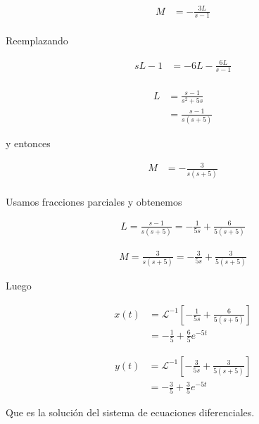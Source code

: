 \documentclass{article}
\theoremstyle{plain}
\theoremstyle{definition}
\begin{document}
\begin{align*}
M &= -\frac{3L}{s-1} \\
\end{align*}

Reemplazando

\begin{align*}
   sL-1 &= -6L-\frac{6L}{s-1} \\
\end{align*}



\begin{align*}
   L &= \frac{s-1}{s^2+5s} \\
   &= \frac{s-1}{s(s+5)}
\end{align*}

y entonces

\begin{align*}
M &= -\frac{3}{s(s+5)} \\
\end{align*}


Usamos fracciones parciales y obtenemos

\begin{align*}
L=\frac{s-1}{s(s+5)} = -\frac{1}{5s}+\frac{6}{5(s+5)}
\end{align*}

\begin{align*}
M= \frac{3}{s(s+5)} = -\frac{3}{5s}+\frac{3}{5(s+5)}
\end{align*}


Luego


\begin{align*}
x(t) &= \mathcal{L}^{-1} \left[ -\frac{1}{5s}+\frac{6}{5(s+5)}\right] \\
&= -\frac{1}{5}+ \frac{6}{5}e^{-5t}
\end{align*}


\begin{align*}
y(t) &= \mathcal{L}^{-1} \left[ -\frac{3}{5s}+\frac{3}{5(s+5)}\right] \\
&= -\frac{3}{5}+ \frac{3}{5}e^{-5t}
\end{align*}

Que es la solución del sistema de ecuaciones diferenciales.
\end{document}
